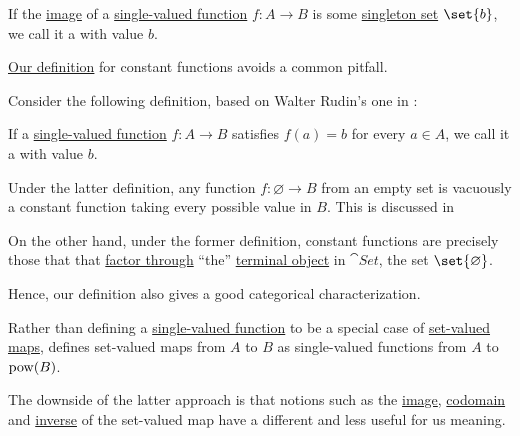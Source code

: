 \begin{definition}\label{def:constant_function}\mimprovised
  If the \hyperref[def:set_valued_map/image]{image} of a \hyperref[def:function]{single-valued function} \( f: A \to B \) is some \hyperref[rem:singleton_sets]{singleton set} \( \set{ b } \), we call it a  with value \( b \).
\end{definition}

\begin{remark}\label{rem:constant_function}
  \hyperref[def:constant_function]{Our definition} for constant functions avoids a common pitfall.

  Consider the following definition, based on Walter Rudin's one in \cite[def. 4.3]{Rudin1976Principles}:
  \begin{displayquote}
    If a \hyperref[def:function]{single-valued function} \( f: A \to B \) satisfies \( f(a) = b \) for every \( a \in A \), we call it a  with value \( b \).
  \end{displayquote}

  Under the latter definition, any function \( f: \varnothing \to B \) from an empty set is vacuously a constant function taking every possible value in \( B \). This is discussed in

  On the other hand, under the former definition, constant functions are precisely those that that \hyperref[def:factors_through]{factor through} \enquote{the} \hyperref[def:universal_objects/terminal]{terminal object} in \hyperref[def:category_of_small_sets]{\( \cat{Set} \)}, the set \( \set{ \varnothing } \).

  Hence, our definition also gives a good categorical characterization.
\end{remark}

\begin{remark}\label{rem:set_valued_map_as_single_valued}
  Rather than defining a \hyperref[def:function]{single-valued function} to be a special case of \hyperref[def:set_valued_map]{set-valued maps},  defines set-valued maps from \( A \) to \( B \) as single-valued functions from \( A \) to \( \operatorname{pow}(B) \).

  The downside of the latter approach is that notions such as the \hyperref[def:set_valued_map/image]{image}, \hyperref[def:set_valued_map/codomain]{codomain} and \hyperref[def:set_valued_map/inverse]{inverse} of the set-valued map have a different and less useful for us meaning.
\end{remark}

